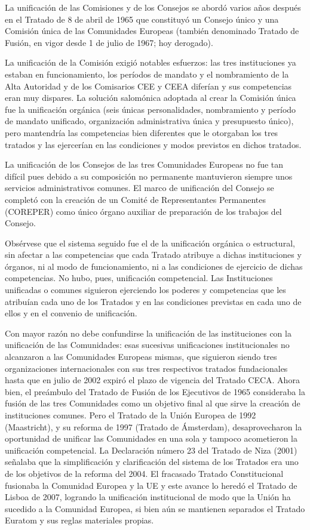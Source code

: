 \documentclass[10pt,a4paper]{article}
\begin{document}
La unificación de las Comisiones y de los Consejos se abordó varios años después en el Tratado de 8 de abril de 1965 que constituyó un Consejo único y una Comisión única de las Comunidades Europeas (también denominado Tratado de Fusión, en vigor desde 1 de julio de 1967; hoy derogado).

La unificación de la Comisión exigió notables esfuerzos: las tres instituciones ya estaban en funcionamiento, los períodos de mandato y el nombramiento de la Alta Autoridad y de los Comisarios CEE y CEEA diferían y sus competencias eran muy dispares. La solución salomónica adoptada al crear la Comisión única fue la unificación orgánica (seis únicas personalidades, nombramiento y período de mandato unificado, organización administrativa única y presupuesto único), pero mantendría las competencias bien diferentes que le otorgaban los tres tratados y las ejercerían en las condiciones y modos previstos en dichos tratados.

La unificación de los Consejos de las tres Comunidades Europeas no fue tan difícil pues debido a su composición no permanente mantuvieron siempre unos servicios administrativos comunes. El marco de unificación del Consejo se completó con la creación de un Comité de Representantes Permanentes (COREPER) como único órgano auxiliar de preparación de los trabajos del Consejo. 

Obsérvese que el sistema seguido fue el de la unificación orgánica o estructural, sin afectar a las competencias que cada Tratado atribuye a dichas instituciones y órganos, ni al modo de funcionamiento, ni a las condiciones de ejercicio de dichas competencias. No hubo, pues, unificación competencial. Las Instituciones unificadas o comunes siguieron ejerciendo los poderes y competencias que les atribuían cada uno de los Tratados y en las condiciones previstas en cada uno de ellos y en el convenio de unificación.

Con mayor razón no debe confundirse la unificación de las instituciones con la unificación de las Comunidades: esas sucesivas unificaciones institucionales no alcanzaron a las Comunidades Europeas mismas, que siguieron siendo tres organizaciones internacionales con sus tres respectivos tratados fundacionales hasta que en julio de 2002 expiró el plazo de vigencia del Tratado CECA. Ahora bien, el preámbulo del Tratado de Fusión de los Ejecutivos de 1965 consideraba la fusión de las tres Comunidades como un objetivo final al que sirve la creación de instituciones comunes. Pero el Tratado de la Unión Europea de 1992 (Maastricht), y su reforma de 1997 (Tratado de Ámsterdam), desaprovecharon la oportunidad de unificar las Comunidades en una sola y tampoco acometieron la unificación competencial. La Declaración número 23 del Tratado de Niza (2001) señalaba que la simplificación y clarificación del sistema de los Tratados era uno de los objetivos de la reforma del 2004. El fracasado Tratado Constitucional fusionaba la Comunidad Europea y la UE y este avance lo heredó el Tratado de Lisboa de 2007, logrando la unificación institucional de modo que la Unión ha sucedido a la Comunidad Europea, si bien aún se mantienen separados el Tratado Euratom y sus reglas materiales propias.
\end{document}
